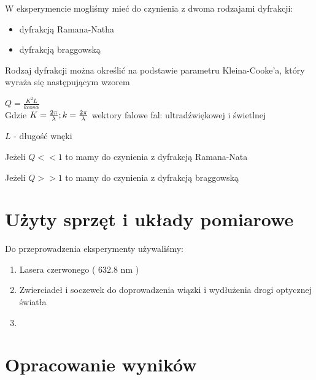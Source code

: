 \documentclass[a4paper,12pt]{article}
\begin{document}


W eksperymencie mogliśmy mieć do czynienia z dwoma rodzajami dyfrakcji:
\begin{itemize}
\item dyfrakcją Ramana-Natha
\item dyfrakcją braggowską
\end{itemize}

Rodzaj dyfrakcji można określić na podstawie parametru Kleina-Cooke'a, który wyraża się następującym wzorem

\(
Q = \frac{K^2  L}{k cos \alpha }
\)
\\
Gdzie
\(
K = \frac{2 \pi}{ \lambda }; \\ k = \frac{2 \pi}{\lambda}
\) wektory falowe fal: ultradźwiękowej i świetlnej

\( L  \) - długość wnęki

Jeżeli \( Q << 1\) to mamy do czynienia z dyfrakcją Ramana-Nata

Jeżeli \( Q >> 1 \) to mamy do czynienia z dyfrakcją braggowską

\section{Użyty sprzęt i układy pomiarowe}


Do przeprowadzenia eksperymenty używaliśmy: 

\begin{enumerate}
  \item Lasera czerwonego ( 632.8 nm ) 
  \item Zwierciadeł i soczewek do doprowadzenia wiązki i wydłużenia drogi optycznej światła
  \item 
  
\end{enumerate}



\section{Opracowanie wyników}
\end{document}
